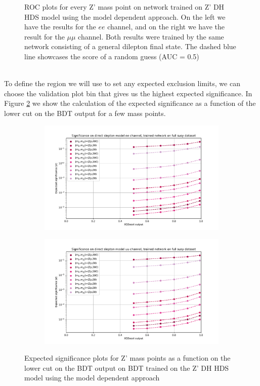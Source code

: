 \documentclass[12pt, a4paper]{book}
\begin{document}
\begin{figure}[!ht]
\begin{subfigure}[b]{0.49\textwidth}
      \end{subfigure}
   \caption[ROC plots for every Z' mass point on network trained on Z' DH HDS model using the model dependent approach]{ROC plots for every Z' mass point on network trained on Z' DH HDS model using the model dependent approach. On the left we have the results for the $ee$ channel, and on the right we have the result for the $\mu\mu$ channel. Both results were 
   trained by the same network consisting of a general dilepton final state. The dashed blue line showcases the score of a random guess (AUC = 0.5)}\label{fig:DH_HDS_ROCS}
\end{figure}
\\To define the region we will use to set any expected exclusion limits, we can choose the validation plot bin that gives us the highest expected significance. In Figure \ref{fig:DH_HDS_exp_sig} we show the calculation of the expected significance as a function of the lower cut on the BDT output 
for a few mass points.
\begin{figure}[!ht]
	\centering
	\begin{subfigure}[b]{0.49\textwidth}
      \centering
      \includegraphics[width=1\textwidth]{XGBoost/DH_HDS/EXP_SIG_ee.pdf}
      \end{subfigure}
   \hfill
   \begin{subfigure}[b]{0.49\textwidth}
      \centering
      \includegraphics[width=1\textwidth]{XGBoost/DH_HDS/EXP_SIG_uu.pdf}
      \end{subfigure}
   \caption{Expected significance plots for Z' mass points as a function on the lower cut on the BDT output on BDT trained on the Z' DH HDS model using the model dependent approach}\label{fig:DH_HDS_exp_sig}
\end{figure}
\end{document}
